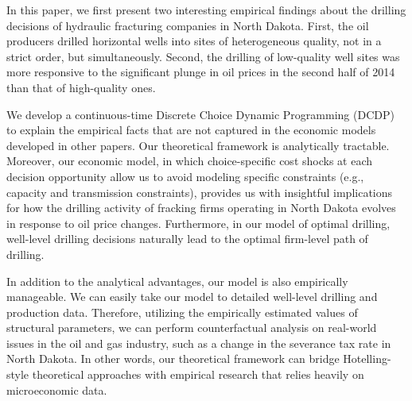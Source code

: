In this paper, we first present two interesting empirical findings about the drilling decisions of hydraulic fracturing companies in North Dakota. First, the oil producers drilled horizontal wells into sites of heterogeneous quality, not in a strict order, but simultaneously. Second, the drilling of low-quality well sites was more responsive to the significant plunge in oil prices in the second half of 2014 than that of high-quality ones. 

We develop a continuous-time Discrete Choice Dynamic Programming (DCDP) to explain the empirical facts that are not captured in the economic models developed in other papers. Our theoretical framework is analytically tractable. Moreover, our economic model, in which choice-specific cost shocks at each decision opportunity allow us to avoid modeling specific constraints (e.g., capacity and transmission constraints), provides us with insightful implications for how the drilling activity of fracking firms operating in North Dakota evolves in response to oil price changes. Furthermore, in our model of optimal drilling, well-level drilling decisions naturally lead to the optimal firm-level path of drilling. 

In addition to the analytical advantages, our model is also empirically manageable. We can easily take our model to detailed well-level drilling and production data. Therefore, utilizing the empirically estimated values of structural parameters, we can perform counterfactual analysis on real-world issues in the oil and gas industry, such as a change in the severance tax rate in North Dakota. In other words, our theoretical framework can bridge Hotelling-style theoretical approaches with empirical research that relies heavily on microeconomic data. 

